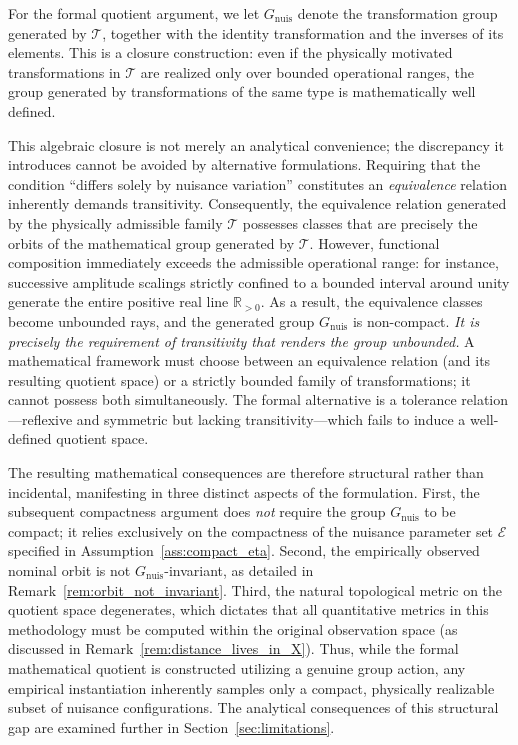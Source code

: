 \documentclass[a4paper]{cas-sc}
\newcommand{\EtaSpace}{\ensuremath{\mathcal{E}}}
\newcommand{\Gnuis}{\ensuremath{G_{\mathrm{nuis}}}}
\newcommand{\R}{\ensuremath{\mathbb{R}}}
\begin{document}
For the formal quotient argument, we let \(\Gnuis\) denote the
transformation group generated by \(\mathcal{T}\), together with the
identity transformation and the inverses of its elements. This is a closure
construction: even if the physically motivated transformations in
\(\mathcal{T}\) are realized only over bounded operational ranges, the group
generated by transformations of the same type is mathematically well
defined.

This algebraic closure is not merely an analytical convenience; the discrepancy it introduces cannot be avoided by alternative formulations. Requiring that the condition ``differs solely by nuisance variation'' constitutes an \emph{equivalence} relation inherently demands transitivity. Consequently, the equivalence relation generated by the physically admissible family \(\mathcal{T}\) possesses classes that are precisely the orbits of the mathematical group generated by \(\mathcal{T}\). However, functional composition immediately exceeds the admissible operational range: for instance, successive amplitude scalings strictly confined to a bounded interval around unity generate the entire positive real line \(\R_{>0}\). As a result, the equivalence classes become unbounded rays, and the generated group \(\Gnuis\) is non-compact. \emph{It is precisely the requirement of transitivity that renders the group unbounded.} A mathematical framework must choose between an equivalence relation (and its resulting quotient space) or a strictly bounded family of transformations; it cannot possess both simultaneously. The formal alternative is a tolerance relation---reflexive and symmetric but lacking transitivity---which fails to induce a well-defined quotient space.

The resulting mathematical consequences are therefore structural rather than incidental, manifesting in three distinct aspects of the formulation. First, the subsequent compactness argument does \emph{not} require the group \(\Gnuis\) to be compact; it relies exclusively on the compactness of the nuisance parameter set \(\EtaSpace\) specified in Assumption~\ref{ass:compact_eta}. Second, the empirically observed nominal orbit is not \(\Gnuis\)-invariant, as detailed in Remark~\ref{rem:orbit_not_invariant}. Third, the natural topological metric on the quotient space degenerates, which dictates that all quantitative metrics in this methodology must be computed within the original observation space (as discussed in Remark~\ref{rem:distance_lives_in_X}). Thus, while the formal mathematical quotient is constructed utilizing a genuine group action, any empirical instantiation inherently samples only a compact, physically realizable subset of nuisance configurations. The analytical consequences of this structural gap are examined further in Section~\ref{sec:limitations}.
\end{document}
